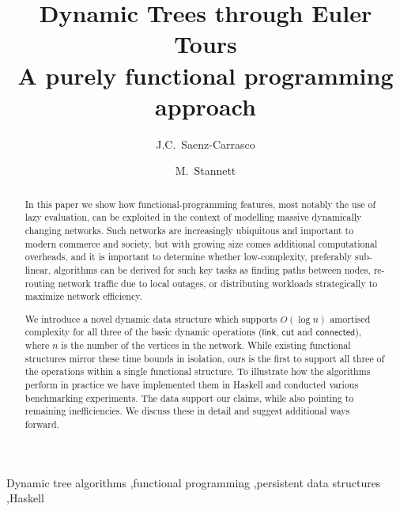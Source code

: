 \documentclass{elsarticle}
\newcommand{\MATHSF}[1]{\ensuremath{\mathsf{#1}}\xspace}
\newcommand{\link}{\MATHSF{link}}
\newcommand{\cut}{\MATHSF{cut}}
\newcommand{\connected}{\MATHSF{connected}}
\begin{document}
\title{Dynamic Trees through Euler Tours\\%
\large{A purely functional programming approach}}

\author{J.C.~Saenz-Carrasco}

\author{M.~Stannett}

\address{Department of Computer Science,\\
Regent Court, 211 Portobello,\\
Sheffield S1 4DP, United Kingdom}


\begin{abstract}
In this paper we show how functional-programming features, most notably the use of lazy evaluation, can be exploited in the context of modelling massive dynamically changing networks. Such networks are increasingly ubiquitous and important to modern commerce and society, but with growing size comes additional computational overheads, and it is important to determine whether low-complexity, preferably sub-linear, algorithms can be derived for such key tasks as finding paths between nodes, re-routing network traffic due to local outages, or distributing workloads strategically to maximize network efficiency.

We introduce a novel dynamic data structure which supports $O(\log n)$ amortised complexity for all three of the basic dynamic operations (\link, \cut and \connected), where $n$ is the number of the vertices in the network. While existing functional structures mirror these time bounds in isolation, ours is the first to support all three of the operations within a single functional structure. To illustrate how the algorithms perform in practice we have implemented them in Haskell and conducted various benchmarking experiments. The data support our claims, while also pointing to remaining inefficiencies. We discuss these in detail and suggest additional ways forward.
\end{abstract}

\begin{keyword}
Dynamic tree algorithms \sep functional programming \sep persistent data structures \sep Haskell
\end{keyword}


\maketitle







 
 
 
 

\end{document}
